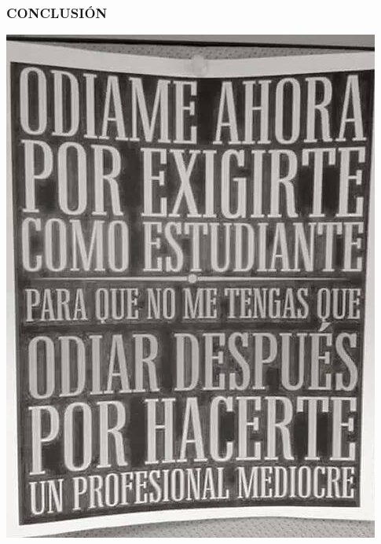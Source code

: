 
\begin{frame}
\frametitle{CONCLUSIÓN}
\begin{center}
\includegraphics[scale=0.31]{Conclusion/UNO}
\end{center}
\end{frame}
